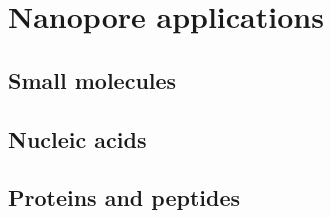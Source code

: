%
%
\section{Nanopore applications}

\subsection{Small molecules}

\subsection{Nucleic acids }

\subsection{Proteins and peptides}








\cleardoublepage

